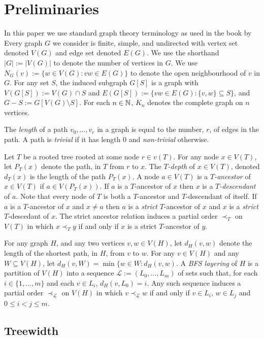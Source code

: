 \documentclass[kpfonts]{patmorin}
\theoremstyle{named}
\begin{document}
\section{Preliminaries}

In this paper we use standard graph theory terminology as used in the book by \citet{diestel:graph}
Every graph $G$ we consider is finite, simple, and undirected with vertex set denoted $V(G)$ and edge set denoted $E(G)$.  We use the shorthand $|G|:=|V(G)|$ to denote the number of vertices in $G$.  We use $N_G(v):=\{w\in V(G): vw\in E(G)\}$ to denote the open neighbourhood of $v$ in $G$.  For any set $S$, the induced subgraph  $G[S]$ is a graph with $V(G[S]):=V(G)\cap S$ and $E(G[S]):=\{vw\in E(G): \{v,w\}\subseteq S\}$, and $G-S:=G[V(G)\setminus S]$. For each $n\in\mathbb{N}$, $K_n$ denotes the complete graph on $n$ vertices.

The \emph{length} of a path $v_0,\ldots,v_r$ in a graph is equal to the number, $r$, of edges in the path. A path is \emph{trivial} if it has length 0 and \emph{non-trivial} otherwise.

Let $T$ be a rooted tree rooted at some node $r\in v(T)$.  For any node $x\in V(T)$, let $P_T(x)$ denote the path, in $T$ from $r$ to $x$.  The \emph{$T$-depth} of $x\in V(T)$, denoted $d_T(x)$ is the length of the path $P_T(x)$.  A node $a\in V(T)$ is a \emph{$T$-ancestor} of $x\in V(T)$ if $a\in V(P_T(x))$. If $a$ is a $T$-ancestor of $x$ then $x$ is a \emph{$T$-descendant} of $a$.  Note that every node of $T$ is both a $T$-ancestor and $T$-descendant of itself.  If $a$ is a $T$-ancestor of $x$ and $x\neq a$ then $a$ is a \emph{strict} $T$-ancestor of $x$ and $x$ is a \emph{strict} $T$-descedant of $x$.  The strict ancestor relation induces a partial order $\prec_T$ on $V(T)$ in which $x\prec_T y$ if and only if $x$ is a strict $T$-ancestor of $y$.

For any graph $H$, and any two vertices $v,w\in V(H)$, let $d_H(v,w)$ denote the length of the shortest path, in $H$, from $v$ to $w$. For any $v\in V(H)$ and any $W\subseteq V(H)$, let $d_H(v,W)=\min\{w\in W: d_H(v,w)$. A \emph{BFS layering} of $H$ is a partition of $V(H)$ into a sequence $\mathcal{L}:=(L_0,\ldots,L_m)$ of sets such that, for each $i\in\{1,\ldots,m\}$ and each $v\in L_i$, $d_H(v,L_0)=i$.  Any such sequence induces a partial order $\prec_{\mathcal{L}}$ on $V(H)$ in which $v\prec_{\mathcal{L}} w$ if and only if $v\in L_i$, $w\in L_j$ and $0\le i<j\le m$.


\subsection{Treewidth}
\end{document}
